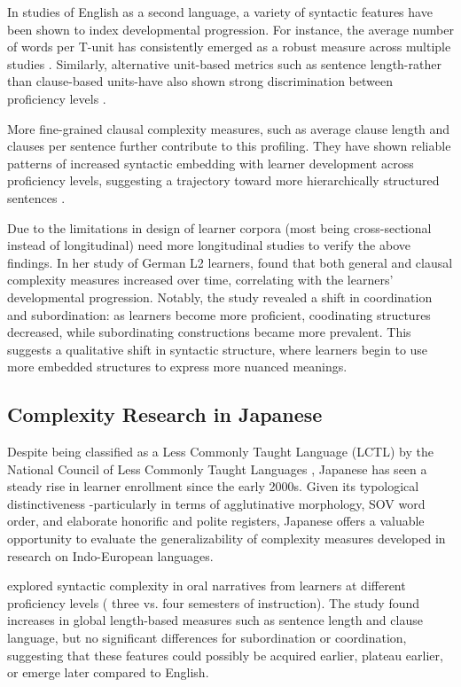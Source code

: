 In studies of English as a second language, a variety of syntactic features have been shown to index developmental
progression. For instance, the average number of words per T-unit has consistently emerged as a robust measure
across multiple studies \citep{Ortega2003,Wolfe1998,Lu2011, Lu2010, Iwashita2006}. Similarly, alternative unit-based
metrics such as sentence length-rather than clause-based units-have also shown strong discrimination between
proficiency levels \citep{Ortega2003, Lu2011}.

More fine-grained clausal complexity measures, such as average clause length and clauses per sentence further
contribute to this profiling. They have shown reliable patterns of increased syntactic embedding with learner
development across proficiency levels, suggesting a trajectory toward more hierarchically structured sentences \citep{Ortega2003, Lu2011}.

Due to the limitations in design of learner corpora (most being cross-sectional instead of longitudinal) need more
longitudinal studies to verify the above findings. In her study of German L2 learners, \cite{Vyatkina2012} found
that both general and clausal complexity measures increased over time, correlating with the learners' developmental
progression. Notably, the study revealed a shift in coordination and subordination: as learners become more
proficient, coodinating structures decreased, while subordinating constructions became more prevalent. This suggests
a qualitative shift in syntactic structure, where learners begin to use more embedded structures to express more
nuanced
meanings.


\subsection{Complexity Research in Japanese}
Despite being classified as a Less Commonly Taught Language (LCTL) by the National Council of Less Commonly Taught
Languages \cite{ncolctl2025}, Japanese has seen a steady rise in learner enrollment since the early 2000s. Given its
typological distinctiveness -particularly in terms of agglutinative morphology, SOV word order, and elaborate
honorific and polite registers, Japanese offers a valuable opportunity to evaluate the generalizability of
complexity measures developed in research on Indo-European languages.

\cite{Iwashita2006} explored syntactic complexity in oral narratives from learners at different proficiency levels (
three vs. four semesters of instruction). The study found increases in global length-based measures such as sentence
length and clause language, but no significant differences for subordination or coordination, suggesting that these
features could possibly be acquired earlier, plateau earlier, or emerge later compared to English.

